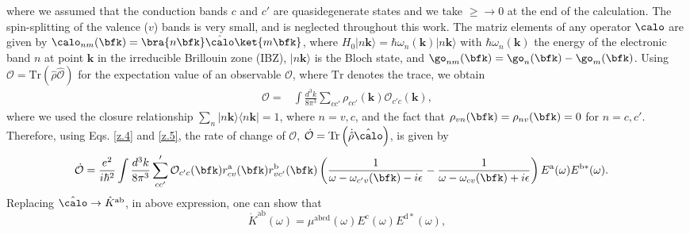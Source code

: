\documentclass[floatfix,prb,aps,superscriptaddress,showpacs,11pt,preprint,letterpaper]{revtex4}
\begin{document}
where we assumed that the conduction bands $c$ and $c'$
are quasidegenerate  states and we take $\ge\to 0$ at the end of the
calculation.  The spin-splitting of the valence ($v$) bands is very
small, and is neglected throughout this work.\cite{nastosPRB07}
The matriz elements of any operator $\calo$ are given by
$\calo_{nm}(\bfk)=\bra{n\bfk}\hat\calo\ket{m\bfk}$,
where 
$H_{0}|n\mathbf{k}\rangle = \hbar \omega_{n}(\mathbf{k})|n\mathbf{k}\rangle$ 
with $\hbar \omega_{n}(\mathbf{k})$ the energy of the
electronic band $n$ at point $\mathbf{k}$ in the irreducible Brillouin zone
(IBZ),  $|n\mathbf{k}\rangle$ is the Bloch state, and 
$\go_{nm}(\bfk)=\go_{n}(\bfk)-\go_{m}(\bfk)$.
Using 
$\mathcal{O} = \mathrm{Tr}(\hat{\rho}\hat{\mathcal{O}})$
for the expectation value of an observable $\mathcal{O}$, 
where $\mathrm{Tr}$ denotes the trace, we obtain
\begin{align}\label{z.5}
\mathcal{O} 
=& 
\int \frac{d^{3}k}{8\pi^{3}} \sum_{cc'} \rho_{cc'}(\mathbf{k}) 
\mathcal{O}_{c'c}(\mathbf{k}),
\end{align}
where we used 
the closure
relationship $\sum_{n}|n\mathbf{k}\rangle \langle n\mathbf{k}| = 1$,
where $n=v,c$,
and the fact that $\rho_{vn}(\bfk)=\rho_{nv}(\bfk)=0$ for $n=c,c'$. 
Therefore, 
using  Eqs. \eqref{z.4} and \eqref{z.5},
the
rate of change of $\mathcal{O}$,
$\dot{\mathcal{O}} 
=
\mathrm{Tr} \left( \dot{\hat\rho} \hat\calo \right)
$,
 is given by
\begin{align}
\dot{\mathcal{O}} 
&=\frac{e^{2}}{i\hbar^{2}} \int \frac{d^{3}k}{8\pi^{3}} 
\sum'_{cc'} \mathcal{O}_{c'c}(\bfk) 
r^{\mathrm{a}}_{cv}(\bfk)  r^{\mathrm{b}}_{vc'}(\bfk)  
\left( \frac{1}{\omega - \omega_{c'v}(\bfk)  - i\epsilon} - 
\frac{1}{\omega - \omega_{cv}(\bfk)  + i\epsilon} \right)
E^{\mathrm{a}}(\omega) E^{\mathrm{b*}}(\omega)
\label{eq:dotO}
.
\end{align}
Replacing  $\hat\calo \rightarrow \hat{K}^{\mathrm{ab}}$, in 
above expression, one can show that
\begin{equation}
\dot{K}^{\mathrm{ab}}(\omega) =
\mu^{\mathrm{abcd}}(\omega)
E^{\mathrm{c}}(\omega) E^{\mathrm{d*}}(\omega),
\label{eq:dotk}
\end{equation}
\end{document}
